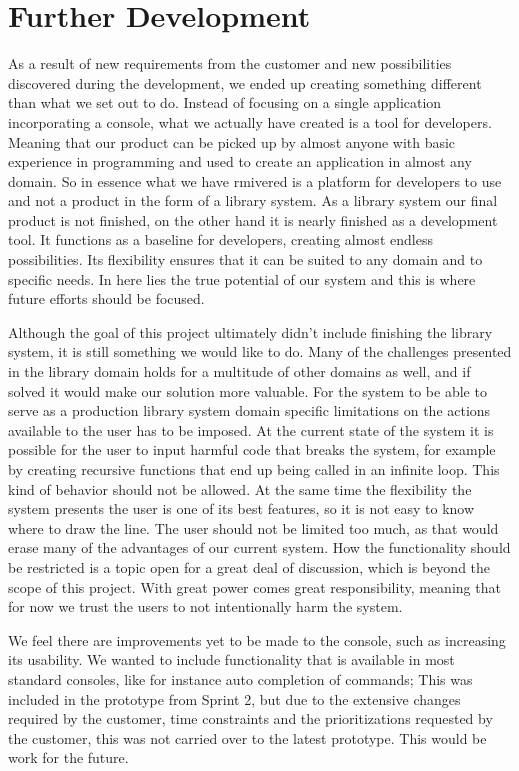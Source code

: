 \section{Further Development}
As a result of new requirements from the customer and new possibilities discovered during the development, we ended up creating something different than what we set out to do. Instead of focusing on a single application incorporating a console, what we actually have created is a tool for developers. Meaning that our product can be picked up by almost anyone with basic experience in programming and used to create an application in almost any domain. So in essence what we have rmivered is a platform for developers to use and not a product in the form of a library system. As a library system our final product is not finished, on the other hand it is nearly finished as a development tool. It functions as a baseline for developers, creating almost endless possibilities. Its flexibility ensures that it can be suited to any domain and to specific needs. In here lies the true potential of our system and this is where future efforts should be focused.

Although the goal of this project ultimately didn’t include finishing the library system, it is still something we would like to do. Many of the challenges presented in the library domain holds for a multitude of other domains as well, and if solved it would make our solution more valuable. For the system to be able to serve as a production library system domain specific limitations on the actions available to the user has to be imposed. At the current state of the system it is possible for the user to input harmful code that breaks the system, for example by creating recursive functions that end up being called in an infinite loop. This kind of behavior should not be allowed. At the same time the flexibility the system presents the user is one of its best features, so it is not easy to know where to draw the line. The user should not be limited too much, as that would erase many of the advantages of our current system. How the functionality should be restricted is a topic open for a great deal of discussion, which is beyond the scope of this project. With great power comes great responsibility, meaning that for now we trust the users to not intentionally harm the system.

We feel there are improvements yet to be made to the console, such as increasing its usability. We wanted to include functionality that is available in most standard consoles, like for instance auto completion of commands; This was included in the prototype from Sprint 2, but due to the extensive changes required by the customer, time constraints and the prioritizations requested by the customer, this was not carried over to the latest prototype. This would be work for the future.

